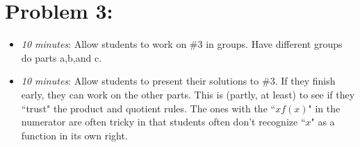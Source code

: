 \documentclass[handout,nooutcomes]{ximera}
\begin{document}
\section*{Problem 3:}

	\begin{itemize}
	
	\item  \emph{10 minutes}:  Allow students to work on \#3 in groups.  Have different groups do parts a,b,and c.
		
	\item  \emph{10 minutes}:  Allow students to present their solutions to \#3.  If they finish early, they can work on the other parts.  This is (partly, at least) to see if they ``trust" the product and quotient rules.  The ones with the ``$xf(x)$" in the numerator are often tricky in that students often don't recognize ``$x$" as a function in its own right. 	
	\end{itemize}	
	
	
	

	
	

	
	
	

	
	
	
\end{document}
